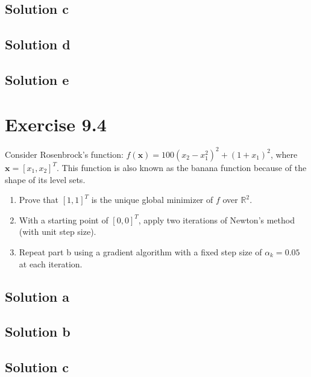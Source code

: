 \documentclass{article}
\newcommand{\bld}[1]{\boldsymbol{#1}}
\begin{document}
\subsection*{Solution c}
\subsection*{Solution d}
\subsection*{Solution e}
\section*{Exercise 9.4}
Consider Rosenbrock's function: $f(\bld{x})=100(x_2-x_1^2)^2+(1+x_1)^2$, where
$\bld{x}=[x_1,x_2]^T$. This function is also known as the banana function because of the shape of its level sets.
\begin{enumerate}[label=\alph*.]
\item Prove that $[1,1]^T$ is the unique global minimizer of $f$ over
	$\mathbb{R}^2$.
\item With a starting point of $[0,0]^T$, apply two iterations of Newton's
	method (with unit step size).
\item Repeat part b using a gradient algorithm with a fixed step size of
	$\alpha_k=0.05$ at each iteration.
\end{enumerate}
\subsection*{Solution a}
\subsection*{Solution b}
\subsection*{Solution c}
\end{document}

